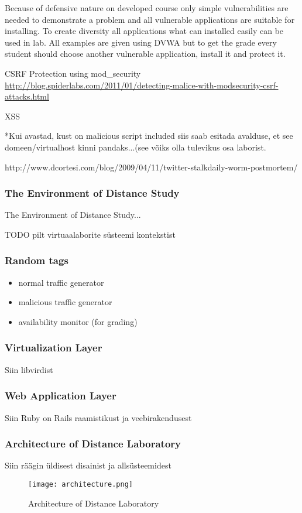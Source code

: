 Because of defensive nature on developed course only simple vulnerabilities are needed to demonstrate a problem and all vulnerable applications are suitable for installing. To create diversity all applications what can installed easily can be used in lab. All examples are given using \gls{DVWA} but to get the grade every student should choose another vulnerable application, install it and protect it.


\gls{CSRF}
Protection using mod\_security
\url{http://blog.spiderlabs.com/2011/01/detecting-malice-with-modsecurity-csrf-attacks.html}

\gls{XSS}
{
\color{red} *Kui avastad, kust on malicious script included siis saab esitada avalduse, et see domeen/virtualhost kinni pandaks...(see võiks olla tulevikus osa laborist.

http://www.dcortesi.com/blog/2009/04/11/twitter-stalkdaily-worm-postmortem/
}






\subsubsection{The Environment of Distance Study}
\label{The Environment of Distance Study}
The Environment of Distance Study...

TODO pilt virtuaalaborite süsteemi kontekstist
\subsubsection{Random tags}
\begin{itemize}
	\item normal traffic generator
	\item malicious traffic generator
	\item availability monitor (for grading)
\end{itemize}

\subsubsection{Virtualization Layer}
Siin libvirdist
\subsubsection{Web Application Layer}
Siin Ruby on Rails raamistikust ja veebirakendusest
\subsubsection{Architecture of Distance Laboratory}
Siin räägin üldisest disainist ja allsüsteemidest
\
\begin{figure}[ht]
\centering
\texttt{[image: architecture.png]}
\caption{Architecture of Distance Laboratory}
\label{fig:Architecture of Distance Laboratory}
\end{figure}
\


